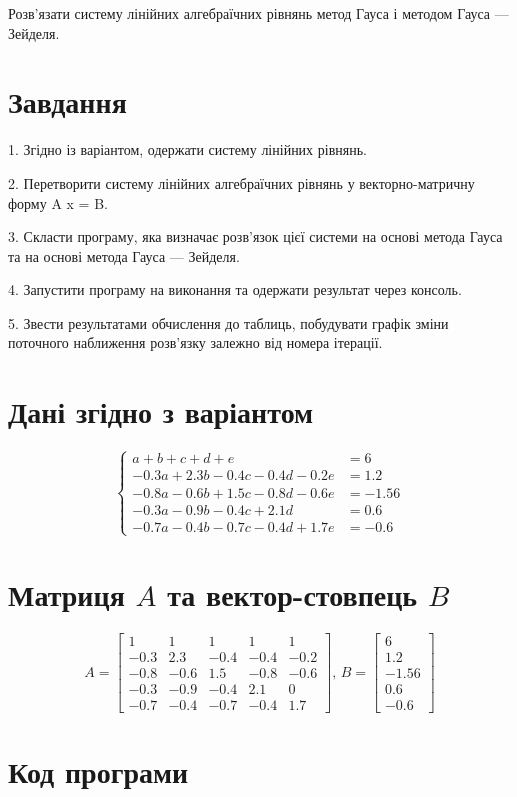 \documentclass[a4paper, 12pt, oneside]{extarticle}
\renewcommand\Variant{
$$
\begin{cases}
	a + b + c + d + e &= 6 \\
-0.3 a + 2.3 b - 0.4 c - 0.4 d - 0.2 e &= 1.2  \\
-0.8 a - 0.6 b + 1.5 c - 0.8 d - 0.6 e &= -1.56  \\
-0.3 a - 0.9 b - 0.4 c + 2.1 d &= 0.6  \\
-0.7 a - 0.4 b - 0.7 c - 0.4 d + 1.7 e &= -0.6
\end{cases}
$$
	}
\newcommand\tcobx[1]{
\begin{tcolorbox}[breakable, arc=0mm, colback=white, boxrule=0.2mm, beforeafter skip=0pt]
	#1
\end{tcolorbox}
}
\begin{document}
\Margins


\tcobx{
	Розв’язати систему лінійних алгебраїчних рівнянь метод Гауса і методом Гауса — Зейделя.
}

\section*{Завдання}
\tcobx{
1. Згідно із варіантом, одержати систему лінійних рівнянь.

2. Перетворити систему лінійних алгебраїчних рівнянь у векторно-матричну форму A x = B.

3. Скласти програму, яка визначає розв’язок цієї системи на основі метода Гауса та на основі
метода Гауса — Зейделя.

4. Запустити програму на виконання та одержати результат через консоль.

5. Звести результатами обчислення до таблиць, побудувати графік зміни поточного наближення
розв’язку залежно від номера ітерації.
}

\section*{Дані згідно з варіантом}

\tcobx{
	\Variant
}

\section*{ Матриця $A$ та вектор-стовпець $B$ }

\tcobx{
$$
A = \begin{bmatrix}
1 & 1 & 1 & 1 & 1  \\
-0.3 & 2.3 &- 0.4 &- 0.4 &- 0.2  \\
-0.8 &- 0.6 & 1.5 &- 0.8 &- 0.6  \\
-0.3 &- 0.9 &- 0.4 & 2.1 & 0 \\
-0.7 &- 0.4 &- 0.7 &- 0.4 & 1.7
\end{bmatrix},\,
B = \begin{bmatrix}
6 \\
1.2  \\
-1.56  \\
0.6  \\
-0.6
\end{bmatrix}
$$
}

\section*{ Код програми}
\end{document}

